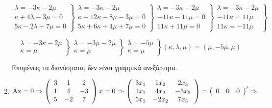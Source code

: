 \documentclass[12pt,a4paper]{article}
\begin{document}
\begin{enumerate}
\[\left. {\begin{array}{*{20}{c}}
{\lambda  =  - 3\kappa  - 2\mu }\\
{\kappa  + 4\lambda  - 3\mu  = 0}\\
{5\kappa  - 2\lambda  + 7\mu  = 0}
\end{array}} \right\}\left. {\begin{array}{*{20}{c}}
{\lambda  =  - 3\kappa  - 2\mu }\\
{\kappa  - 12\kappa  - 8\mu  - 3\mu  = 0}\\
{5\kappa  + 6\kappa  + 4\mu  + 7\mu  = 0}
\end{array}} \right\}\left. {\begin{array}{*{20}{c}}
{\lambda  =  - 3\kappa  - 2\mu }\\
{ - 11\kappa  - 11\mu  = 0}\\
{11\kappa  + 11\mu  = 0}
\end{array}} \right\}\left. {\begin{array}{*{20}{c}}
{\lambda  =  - 3\kappa  - 2\mu }\\
{ - 11\kappa  = 11\mu }\\
{11\kappa  =  - 11\mu }
\end{array}} \right\}\]

\[\left. {\begin{array}{*{20}{c}}
{\lambda  =  - 3\kappa  - 2\mu }\\
{\kappa  = \mu }
\end{array}} \right\}\left. {\begin{array}{*{20}{c}}
{\lambda  =  - 3\mu  - 2\mu }\\
{\kappa  = \mu }
\end{array}} \right\}\left. {\begin{array}{*{20}{c}}
{\lambda  =  - 5\mu }\\
{\kappa  = \mu }
\end{array}} \right\}(\kappa ,\lambda ,\mu ) = (\mu , - 5\mu ,\mu )\]
\begin{center}
Επομένως τα διανύσματα, δεν είναι γραμμικά ανεξάρτητα.
\end{center}
\item 
\[{\rm{Ax}} = 0 \Rightarrow \left( {\begin{array}{*{20}{c}}
3&1&2\\
1&4&{ - 3}\\
5&{ - 2}&7
\end{array}} \right)x = 0 \Rightarrow \left( {\begin{array}{*{20}{c}}
{3{x_1}}&{1{x_2}}&{2{x_3}}\\
{1{x_1}}&{4{x_2}}&{ - 3{x_3}}\\
{5{x_1}}&{ - 2{x_2}}&{7{x_3}}
\end{array}} \right) = \left( {\begin{array}{*{20}{c}}
0&0&0
\end{array}} \right)' \Rightarrow \]\\


\end{enumerate}
\end{document}

